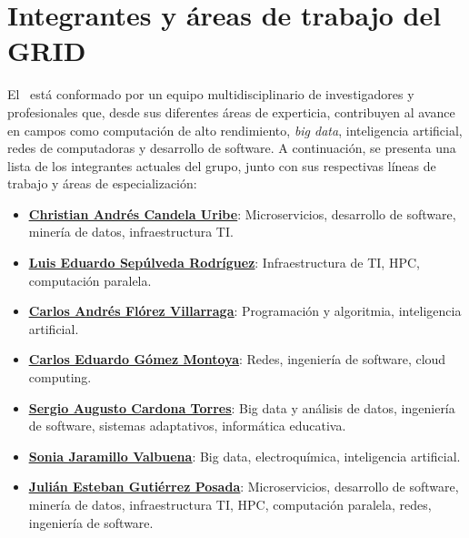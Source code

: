 \section{Integrantes y áreas de trabajo del GRID}
El \GRID\ está conformado por un equipo multidisciplinario de investigadores y profesionales que, desde sus diferentes áreas de experticia, contribuyen al avance en campos como computación de alto rendimiento, \textit{big data}, inteligencia artificial, redes de computadoras y desarrollo de software. A continuación, se presenta una lista de los integrantes actuales del grupo, junto con sus respectivas líneas de trabajo y áreas de especialización:
\begin{itemize}
  \item \href{https://scienti.minciencias.gov.co/cvlac/visualizador/generarCurriculoCv.do?cod_rh=0000210897}{\underline{{\textbf{Christian Andrés Candela Uribe}}}}: Microservicios, desarrollo de software, minería de datos, infraestructura TI.\@
  \item \href{https://scienti.minciencias.gov.co/cvlac/visualizador/generarCurriculoCv.do?cod_rh=0001383939}{\underline{{\textbf{Luis Eduardo Sepúlveda Rodríguez}}}}: Infraestructura de TI, HPC, computación paralela.
  \item \href{https://scienti.minciencias.gov.co/cvlac/visualizador/generarCurriculoCv.do?cod_rh=0001638854}{\underline{{\textbf{Carlos Andrés Flórez Villarraga}}}}: Programación y algoritmia, inteligencia artificial.
  \item \href{https://scienti.minciencias.gov.co/cvlac/visualizador/generarCurriculoCv.do?cod_rh=0001343801}{\underline{{\textbf{Carlos Eduardo Gómez Montoya}}}}: Redes, ingeniería de software, cloud computing.
  \item \href{https://scienti.minciencias.gov.co/cvlac/visualizador/generarCurriculoCv.do?cod_rh=0001398775}{\underline{{\textbf{Sergio Augusto Cardona Torres}}}}: Big data y análisis de datos, ingeniería de software, sistemas adaptativos, informática educativa.
  \item \href{https://scienti.minciencias.gov.co/cvlac/visualizador/generarCurriculoCv.do?cod_rh=0000193550}{\underline{{\textbf{Sonia Jaramillo Valbuena}}}}: Big data, electroquímica, inteligencia artificial.
  \item \href{https://scienti.minciencias.gov.co/cvlac/visualizador/generarCurriculoCv.do?cod_rh=0000283495}{\underline{{\textbf{Julián Esteban Gutiérrez Posada}}}}: Microservicios, desarrollo de software, minería de datos, infraestructura TI, HPC, computación paralela, redes, ingeniería de software.
\end{itemize}

